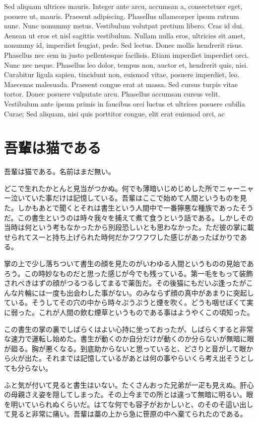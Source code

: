 \documentclass[a4paper,10pt]{ltjsarticle}
\begin{document}
Sed aliquam ultrices mauris. Integer ante arcu, accumsan a, consectetuer eget, posuere ut, mauris. Praesent adipiscing. Phasellus ullamcorper ipsum rutrum nunc. Nunc nonummy metus. Vestibulum volutpat pretium libero. Cras id dui. Aenean ut eros et nisl sagittis vestibulum. Nullam nulla eros, ultricies sit amet, nonummy id, imperdiet feugiat, pede. Sed lectus. Donec mollis hendrerit risus. Phasellus nec sem in justo pellentesque facilisis. Etiam imperdiet imperdiet orci. Nunc nec neque. Phasellus leo dolor, tempus non, auctor et, hendrerit quis, nisi. Curabitur ligula sapien, tincidunt non, euismod vitae, posuere imperdiet, leo. Maecenas malesuada. Praesent congue erat at massa. Sed cursus turpis vitae tortor. Donec posuere vulputate arcu. Phasellus accumsan cursus velit. Vestibulum ante ipsum primis in faucibus orci luctus et ultrices posuere cubilia Curae; Sed aliquam, nisi quis porttitor congue, elit erat euismod orci, ac

    \section{吾輩は猫である}

吾輩は猫である。名前はまだ無い。

どこで生れたかとんと見当がつかぬ。何でも薄暗いじめじめした所でニャーニャー泣いていた事だけは記憶している。吾輩はここで始めて人間というものを見た。しかもあとで聞くとそれは書生という人間中で一番獰悪な種族であったそうだ。この書生というのは時々我々を捕えて煮て食うという話である。しかしその当時は何という考もなかったから別段恐しいとも思わなかった。ただ彼の掌に載せられてスーと持ち上げられた時何だかフワフワした感じがあったばかりである。

掌の上で少し落ちついて書生の顔を見たのがいわゆる人間というものの見始であろう。この時妙なものだと思った感じが今でも残っている。第一毛をもって装飾されべきはずの顔がつるつるしてまるで薬缶だ。その後猫にもだいぶ逢ったがこんな片輪には一度も出会わした事がない。のみならず顔の真中があまりに突起している。そうしてその穴の中から時々ぷうぷうと煙を吹く。どうも咽せぽくて実に弱った。これが人間の飲む煙草というものである事はようやくこの頃知った。

この書生の掌の裏でしばらくはよい心持に坐っておったが、しばらくすると非常な速力で運転し始めた。書生が動くのか自分だけが動くのか分らないが無暗に眼が廻る。胸が悪くなる。到底助からないと思っていると、どさりと音がして眼から火が出た。それまでは記憶しているがあとは何の事やらいくら考え出そうとしても分らない。

ふと気が付いて見ると書生はいない。たくさんおった兄弟が一疋も見えぬ。肝心の母親さえ姿を隠してしまった。その上今までの所とは違って無暗に明るい。眼を明いていられぬくらいだ。はてな何でも容子がおかしいと、のそのそ這い出して見ると非常に痛い。吾輩は藁の上から急に笹原の中へ棄てられたのである。
\end{document}

